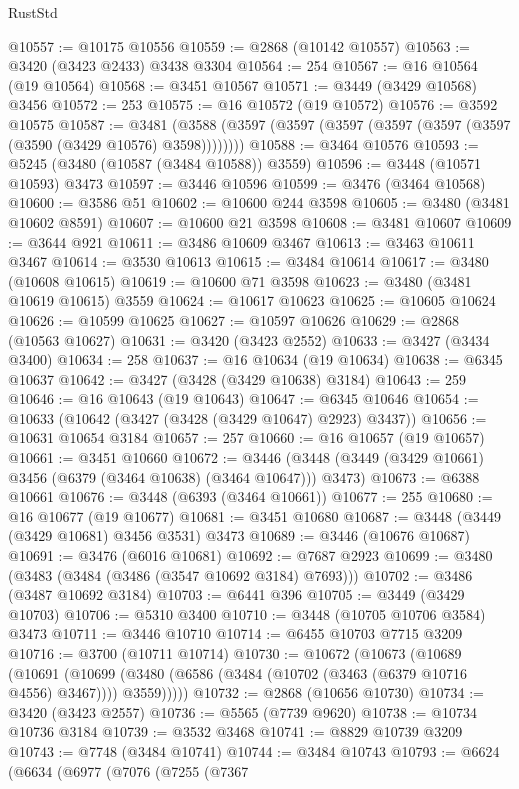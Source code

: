 \begin{lexlean}{RustStd}
\begin{coremodule}
{{{{{{{{{{{{{{{{{{{@10557 := @10175 @10556
@10559 := @2868 (@10142 @10557)
@10563 := @3420 (@3423 @2433) @3438 @3304
@10564 := 254
@10567 := @16 @10564 (@19 @10564)
@10568 := @3451 @10567
@10571 := @3449 (@3429 @10568) @3456
@10572 := 253
@10575 := @16 @10572 (@19 @10572)
@10576 := @3592 @10575
@10587 := @3481 (@3588 (@3597 (@3597 (@3597 (@3597 (@3597 (@3597 (@3590 (@3429 @10576) @3598))))))))
@10588 := @3464 @10576
@10593 := @5245 (@3480 (@10587 (@3484 @10588)) @3559)
@10596 := @3448 (@10571 @10593) @3473
@10597 := @3446 @10596
@10599 := @3476 (@3464 @10568)
@10600 := @3586 @51
@10602 := @10600 @244 @3598
@10605 := @3480 (@3481 @10602 @8591)
@10607 := @10600 @21 @3598
@10608 := @3481 @10607
@10609 := @3644 @921
@10611 := @3486 @10609 @3467
@10613 := @3463 @10611 @3467
@10614 := @3530 @10613
@10615 := @3484 @10614
@10617 := @3480 (@10608 @10615)
@10619 := @10600 @71 @3598
@10623 := @3480 (@3481 @10619 @10615) @3559
@10624 := @10617 @10623
@10625 := @10605 @10624
@10626 := @10599 @10625
@10627 := @10597 @10626
@10629 := @2868 (@10563 @10627)
@10631 := @3420 (@3423 @2552)
@10633 := @3427 (@3434 @3400)
@10634 := 258
@10637 := @16 @10634 (@19 @10634)
@10638 := @6345 @10637
@10642 := @3427 (@3428 (@3429 @10638) @3184)
@10643 := 259
@10646 := @16 @10643 (@19 @10643)
@10647 := @6345 @10646
@10654 := @10633 (@10642 (@3427 (@3428 (@3429 @10647) @2923) @3437))
@10656 := @10631 @10654 @3184
@10657 := 257
@10660 := @16 @10657 (@19 @10657)
@10661 := @3451 @10660
@10672 := @3446 (@3448 (@3449 (@3429 @10661) @3456 (@6379 (@3464 @10638) (@3464 @10647))) @3473)
@10673 := @6388 @10661
@10676 := @3448 (@6393 (@3464 @10661))
@10677 := 255
@10680 := @16 @10677 (@19 @10677)
@10681 := @3451 @10680
@10687 := @3448 (@3449 (@3429 @10681) @3456 @3531) @3473
@10689 := @3446 (@10676 @10687)
@10691 := @3476 (@6016 @10681)
@10692 := @7687 @2923
@10699 := @3480 (@3483 (@3484 (@3486 (@3547 @10692 @3184) @7693)))
@10702 := @3486 (@3487 @10692 @3184)
@10703 := @6441 @396
@10705 := @3449 (@3429 @10703)
@10706 := @5310 @3400
@10710 := @3448 (@10705 @10706 @3584) @3473
@10711 := @3446 @10710
@10714 := @6455 @10703 @7715 @3209
@10716 := @3700 (@10711 @10714)
@10730 := @10672
    (@10673
      (@10689
        (@10691
          (@10699 (@3480 (@6586 (@3484 (@10702 (@3463 (@6379 @10716 @4556) @3467)))) @3559)))))
@10732 := @2868 (@10656 @10730)
@10734 := @3420 (@3423 @2557)
@10736 := @5565 (@7739 @9620)
@10738 := @10734 @10736 @3184
@10739 := @3532 @3468
@10741 := @8829 @10739 @3209
@10743 := @7748 (@3484 @10741)
@10744 := @3484 @10743
@10793 := @6624
    (@6634
      (@6977
        (@7076
          (@7255
            (@7367
}}}}}}}}}}}}}}}}}}}
\end{coremodule}
\end{lexlean}
